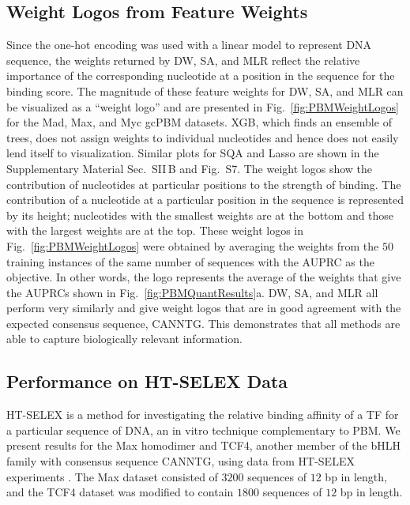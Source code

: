 \documentclass[aps,pra,groupedaddress,nofootinbib,notitlepage,showpacs,floatfix,superscriptaddress]{revtex4-1}
\begin{document}
\subsection*{Weight Logos from Feature Weights}\label{sec:consensusSequence}
Since the one-hot encoding was used with a linear model to represent DNA sequence, the weights returned by DW, SA, and MLR reflect the relative importance of the corresponding nucleotide at a position in the sequence for the binding score. The magnitude of these feature weights for DW, SA, and MLR can be visualized as a ``weight logo'' and are presented in Fig.~\ref{fig:PBMWeightLogos} for the Mad, Max, and Myc gcPBM datasets. XGB, which finds an ensemble of trees, does not assign weights to individual nucleotides and hence does not easily lend itself to visualization. Similar plots for SQA and Lasso are shown in the Supplementary Material Sec.~SII\,B and Fig.~S7. The weight logos show the contribution of nucleotides at particular positions to the strength of binding. The contribution of a nucleotide at a particular position in the sequence is represented by its height; nucleotides with the smallest weights are at the bottom and those with the largest weights are at the top. These weight logos in Fig.~\ref{fig:PBMWeightLogos} were obtained by averaging the weights from the $50$ training instances of the same number of sequences with the AUPRC as the objective. In other words, the logo represents the average of the weights that give the AUPRCs shown in Fig.~\ref{fig:PBMQuantResults}a. DW, SA, and MLR all perform very similarly and give weight logos that are in good agreement with the expected consensus sequence, CANNTG. This demonstrates that all methods are able to capture biologically relevant information. 

\subsection*{Performance on HT-SELEX Data}
\label{sec:TCF4}
HT-SELEX \cite{Jolma:10, Liu:05} is a method for investigating the relative binding affinity of a TF for a particular sequence of DNA, an in vitro technique complementary to PBM. We present results for the Max homodimer and TCF4, another member of the bHLH family with consensus sequence CANNTG, using data from HT-SELEX experiments \cite{Yang:17}. The Max dataset consisted of $3200$ sequences of $12$ bp in length, and the TCF4 dataset was modified to contain $1800$ sequences of $12$ bp in length. 
\end{document}
